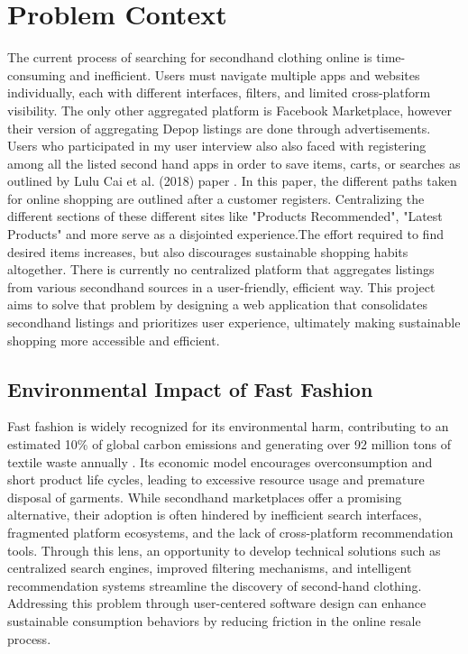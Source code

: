 \documentclass[10pt,twocolumn]{article}
\begin{document}
\section{Problem Context}
The current process of searching for secondhand clothing online is time-consuming and inefficient. Users must navigate multiple apps and websites individually, each with different interfaces, filters, and limited cross-platform visibility. The only other aggregated platform is Facebook Marketplace, however their version of aggregating Depop listings are done through advertisements. Users who participated in my user interview also  also faced with registering among all the listed second hand apps in order to save items, carts, or searches as outlined by Lulu Cai et al. (2018) paper \cite{cai2018}. In this paper, the different paths taken for online shopping are outlined after a customer registers. Centralizing the different sections of these different sites like "Products Recommended", "Latest Products" and more serve as a  disjointed experience.The effort required to find desired items increases, but also discourages sustainable shopping habits altogether. There is currently no centralized platform that aggregates listings from various secondhand sources in a user-friendly, efficient way. This project aims to solve that problem by designing a web application that consolidates secondhand listings and prioritizes user experience, ultimately making sustainable shopping more accessible and efficient.

\subsection{Environmental Impact of Fast Fashion}
Fast fashion is widely recognized for its environmental harm, contributing to an estimated 10\% of global carbon emissions and generating over 92 million tons of textile waste annually \cite{un2019}. Its economic model encourages overconsumption and short product life cycles, leading to excessive resource usage and premature disposal of garments. While secondhand marketplaces offer a promising alternative, their adoption is often hindered by inefficient search interfaces, fragmented platform ecosystems, and the lack of cross-platform recommendation tools. Through this lens, an opportunity to develop technical solutions such as centralized search engines, improved filtering mechanisms, and intelligent recommendation systems streamline the discovery of second-hand clothing. Addressing this problem through user-centered software design can enhance sustainable consumption behaviors by reducing friction in the online resale process.
\end{document}
